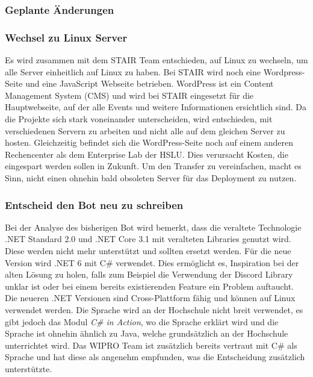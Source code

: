 \documentclass[a4paper, table]{article}
\begin{document}
\subsubsection{Geplante Änderungen}\label{geplanteAenderungen}

\subsubsection*{Wechsel zu Linux Server}
Es wird zusammen mit dem STAIR Team entschieden, auf Linux zu wechseln, um alle Server einheitlich auf Linux zu haben. 
Bei STAIR wird noch eine Wordpress-Seite und eine JavaScript Webseite betrieben. 
WordPress ist ein Content Management System (CMS) und wird bei STAIR eingesetzt für die Hauptwebseite, auf der alle Events und weitere Informationen ersichtlich sind. 
Da die Projekte sich stark voneinander unterscheiden, wird entschieden, mit verschiedenen Servern zu arbeiten und nicht alle auf dem gleichen Server zu hosten. 
Gleichzeitig befindet sich die WordPress-Seite noch auf einem anderen Rechencenter als dem Enterprise Lab der HSLU. 
Dies verursacht Kosten, die eingespart werden sollen in Zukunft. 
Um den Transfer zu vereinfachen, macht es Sinn, nicht einen ohnehin bald obsoleten Server für das Deployment zu nutzen.

\subsubsection*{Entscheid den Bot neu zu schreiben}
Bei der Analyse des bisherigen Bot wird bemerkt, dass die veraltete Technologie .NET Standard 2.0 und .NET Core 3.1 mit veralteten Libraries genutzt wird. 
Diese werden nicht mehr unterstützt und sollten ersetzt werden. 
Für die neue Version wird .NET 6 mit C\# verwendet. 
Dies ermöglicht es, Inspiration bei der alten Lösung zu holen, falls zum Beispiel die Verwendung der Discord Library unklar ist oder bei einem bereits existierenden Feature ein Problem auftaucht. 
Die neueren .NET Versionen sind Cross-Plattform fähig und können auf Linux verwendet werden.\autocite{de_george_installieren_nodate}
Die Sprache wird an der Hochschule nicht breit verwendet, es gibt jedoch das Modul \textit{C\# in Action}\autocite{noauthor_bachelor_nodate}, wo die Sprache erklärt wird und die Sprache ist ohnehin ähnlich zu Java, welche grundsätzlich an der Hochschule unterrichtet wird.
Das WIPRO Team ist zusätzlich bereits vertraut mit C\# als Sprache und hat diese als angenehm empfunden, was die Entscheidung zusätzlich unterstützte. 
\end{document}
